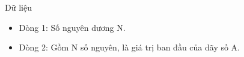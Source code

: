 Dữ liệu  
\begin{itemize}
	\item     Dòng 1: Số nguyên dương N.   
	\item     Dòng 2: Gồm N số nguyên, là giá trị ban đầu của dãy số A.   
\end{itemize}
